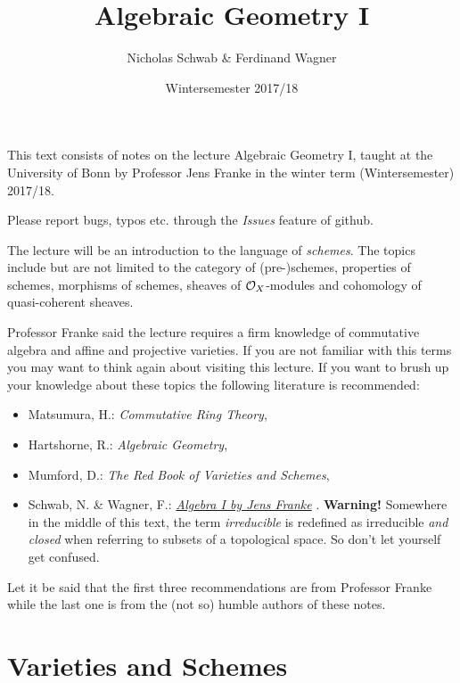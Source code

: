 \documentclass[a4paper,parskip=half,numbers=enddot, DIV=12]{scrreprt}
\title{Algebraic Geometry I}
\author{Nicholas Schwab \& Ferdinand Wagner}
\date{Wintersemester 2017/18}
\begin{document}
\maketitle
{}

\thispagestyle{plain}
This text consists of notes on the lecture Algebraic Geometry I, taught at the University of Bonn by Professor Jens Franke in the winter term (Wintersemester) 2017/18. 

Please report bugs, typos etc. through the \emph{Issues} feature of github.

\tableofcontents

The lecture will be an introduction to the language of \emph{schemes}. The topics include but are not limited to the category of (pre-)schemes, properties of schemes, morphisms of schemes, sheaves of $\mathcal{O}_X$-modules and cohomology of quasi-coherent sheaves.

Professor Franke said the lecture requires a firm knowledge of commutative algebra and affine and projective varieties. If you are not familiar with this terms you may want to think again about visiting this lecture. If you want to brush up your knowledge about these topics the following literature is recommended:
\begin{itemize}
 \item Matsumura, H.: \emph{Commutative Ring Theory},
 \item Hartshorne, R.: \emph{Algebraic Geometry},
 \item Mumford, D.: \emph{The Red Book of Varieties and Schemes},
 \item Schwab, N. \& Wagner, F.: \href{https://github.com/Nicholas42/AlgebraFranke/tree/master/AlgebraI}{\emph{Algebra I by Jens Franke}} \cite{alg1}. \textbf{Warning!} Somewhere in the middle of this text, the term \emph{irreducible} is redefined as irreducible \emph{and closed} when referring to subsets of a topological space. So don't let yourself get confused.
\end{itemize}
Let it be said that the first three recommendations are from Professor Franke while the last one is from the (not so) humble authors of these notes.

\chapter{Varieties and Schemes}
\end{document}
